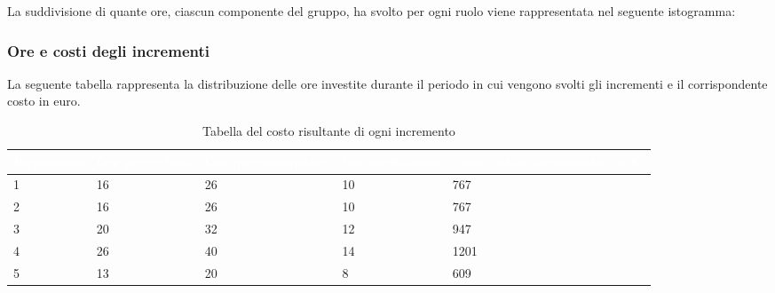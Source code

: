 La suddivisione di quante ore, ciascun componente del gruppo, ha svolto per ogni ruolo viene rappresentata nel seguente istogramma:
\begin{center}
	\pgfplotsset{width=17cm, height=8.5cm}
\end{center}
\clearpage

\subsubsection{Ore e costi degli incrementi}
La seguente tabella rappresenta la distribuzione delle ore investite durante il periodo in cui vengono svolti gli incrementi e il corrispondente costo in euro.


{
\renewcommand{\arraystretch}{1.65}
\centering
\begin{longtable}{ C{2.1cm} C{2.7cm} C{3cm} C{3cm} C{3.3cm} }
\caption{Tabella del costo risultante di ogni incremento}\\
\textcolor{white}{\textbf{Incremento}} & 
\textcolor{white}{\textbf{Ore progettista}} &
\textcolor{white}{\textbf{Ore programmatore}}&
\textcolor{white}{\textbf{Ore verificatore}}&
\textcolor{white}{\textbf{Costo totale incremento (in \euro{})}}\\
\endhead


1 & 16 & 26 & 10 & 767\\
2 & 16 & 26 & 10 & 767\\
3 & 20 & 32 & 12 & 947\\
4 & 26 & 40 & 14 & 1201\\
5 & 13 & 20 & 8  & 609\\



\end{longtable}
}



